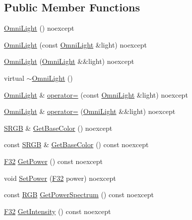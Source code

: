\subsection*{Public Member Functions}
\begin{DoxyCompactItemize}
\item 
\hyperlink{classmage_1_1_omni_light_a7e415936a810268d874f198aa2a9e5d9}{Omni\+Light} () noexcept
\item 
\hyperlink{classmage_1_1_omni_light_ac52de90bfbdc72d50b1f258f734b5fc9}{Omni\+Light} (const \hyperlink{classmage_1_1_omni_light}{Omni\+Light} \&light) noexcept
\item 
\hyperlink{classmage_1_1_omni_light_a541a41f6173c94833def1f30fa90fd6f}{Omni\+Light} (\hyperlink{classmage_1_1_omni_light}{Omni\+Light} \&\&light) noexcept
\item 
virtual \hyperlink{classmage_1_1_omni_light_af6f4921499b430041966f38aac920b69}{$\sim$\+Omni\+Light} ()
\item 
\hyperlink{classmage_1_1_omni_light}{Omni\+Light} \& \hyperlink{classmage_1_1_omni_light_a4c88b169df94819f394967f2e3ebf2f3}{operator=} (const \hyperlink{classmage_1_1_omni_light}{Omni\+Light} \&light) noexcept
\item 
\hyperlink{classmage_1_1_omni_light}{Omni\+Light} \& \hyperlink{classmage_1_1_omni_light_a92225bb01b879ec38f193d7abbc0543e}{operator=} (\hyperlink{classmage_1_1_omni_light}{Omni\+Light} \&\&light) noexcept
\item 
\hyperlink{structmage_1_1_s_r_g_b}{S\+R\+GB} \& \hyperlink{classmage_1_1_omni_light_ab39019947e9964f529bf524950d4801e}{Get\+Base\+Color} () noexcept
\item 
const \hyperlink{structmage_1_1_s_r_g_b}{S\+R\+GB} \& \hyperlink{classmage_1_1_omni_light_aa61c2aa9fcc7f8d9d1140cb4a1ecd1fb}{Get\+Base\+Color} () const noexcept
\item 
\hyperlink{namespacemage_aa97e833b45f06d60a0a9c4fc22ae02c0}{F32} \hyperlink{classmage_1_1_omni_light_a13f9893ef0a19cbb08bfce557bb906fc}{Get\+Power} () const noexcept
\item 
void \hyperlink{classmage_1_1_omni_light_a03f277ecf566147aa54c95816871de10}{Set\+Power} (\hyperlink{namespacemage_aa97e833b45f06d60a0a9c4fc22ae02c0}{F32} power) noexcept
\item 
const \hyperlink{structmage_1_1_r_g_b}{R\+GB} \hyperlink{classmage_1_1_omni_light_a17a0de3d22bfd3dcb2480f516009d885}{Get\+Power\+Spectrum} () const noexcept
\item 
\hyperlink{namespacemage_aa97e833b45f06d60a0a9c4fc22ae02c0}{F32} \hyperlink{classmage_1_1_omni_light_ae7309fdbe54b5d6bc6d4e20990ba6bdc}{Get\+Intensity} () const noexcept

\end{DoxyCompactItemize}
